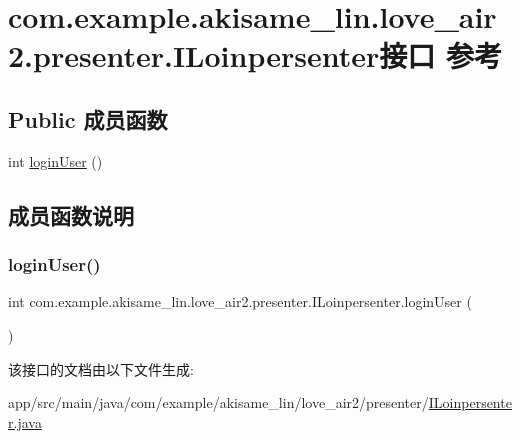 \hypertarget{interfacecom_1_1example_1_1akisame__lin_1_1love__air2_1_1presenter_1_1_i_loinpersenter}{}\section{com.\+example.\+akisame\+\_\+lin.\+love\+\_\+air2.\+presenter.\+I\+Loinpersenter接口 参考}
\label{interfacecom_1_1example_1_1akisame__lin_1_1love__air2_1_1presenter_1_1_i_loinpersenter}
\subsection*{Public 成员函数}
\begin{DoxyCompactItemize}
\item 
int \mbox{\hyperlink{interfacecom_1_1example_1_1akisame__lin_1_1love__air2_1_1presenter_1_1_i_loinpersenter_a801599260bd43dfd3c826ed211ac277c}{login\+User}} ()
\end{DoxyCompactItemize}


\subsection{成员函数说明}
\mbox{\label{interfacecom_1_1example_1_1akisame__lin_1_1love__air2_1_1presenter_1_1_i_loinpersenter_a801599260bd43dfd3c826ed211ac277c}} 
\subsubsection{\texorpdfstring{loginUser()}{loginUser()}}
{\footnotesize\ttfamily int com.\+example.\+akisame\+\_\+lin.\+love\+\_\+air2.\+presenter.\+I\+Loinpersenter.\+login\+User (\begin{DoxyParamCaption}{ }\end{DoxyParamCaption})}



该接口的文档由以下文件生成\+:\begin{DoxyCompactItemize}
\item 
app/src/main/java/com/example/akisame\+\_\+lin/love\+\_\+air2/presenter/\mbox{\hyperlink{_i_loinpersenter_8java}{I\+Loinpersenter.\+java}}\end{DoxyCompactItemize}
